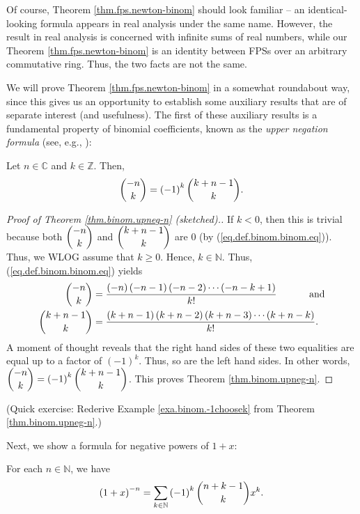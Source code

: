 Of course, Theorem \ref{thm.fps.newton-binom} should look familiar -- an
identical-looking formula appears in real analysis under the same name.
However, the result in real analysis is concerned with infinite sums of real
numbers, while our Theorem \ref{thm.fps.newton-binom} is an identity between
FPSs over an arbitrary commutative ring. Thus, the two facts are not the same.

We will prove Theorem \ref{thm.fps.newton-binom} in a somewhat roundabout way,
since this gives us an opportunity to establish some auxiliary results that
are of separate interest (and usefulness). The first of these auxiliary
results is a fundamental property of binomial coefficients, known as the
\emph{upper negation formula} (see, e.g., \cite[Proposition 1.3.7]{19fco}):

\begin{theorem}
\label{thm.binom.upneg-n}Let $n\in\mathbb{C}$ and $k\in\mathbb{Z}$. Then,%
\[
\dbinom{-n}{k}=\left(  -1\right)  ^{k}\dbinom{k+n-1}{k}.
\]

\end{theorem}

\begin{proof}
[Proof of Theorem \ref{thm.binom.upneg-n} (sketched).]If $k<0$, then this is
trivial because both $\dbinom{-n}{k}$ and $\dbinom{k+n-1}{k}$ are $0$ (by
(\ref{eq.def.binom.binom.eq})). Thus, we WLOG assume that $k\geq0$. Hence,
$k\in\mathbb{N}$. Thus, (\ref{eq.def.binom.binom.eq}) yields%
\begin{align*}
\dbinom{-n}{k}  &  =\dfrac{\left(  -n\right)  \left(  -n-1\right)  \left(
-n-2\right)  \cdots\left(  -n-k+1\right)  }{k!}\ \ \ \ \ \ \ \ \ \ \text{and}%
\\
\dbinom{k+n-1}{k}  &  =\dfrac{\left(  k+n-1\right)  \left(  k+n-2\right)
\left(  k+n-3\right)  \cdots\left(  k+n-k\right)  }{k!}.
\end{align*}
A moment of thought reveals that the right hand sides of these two equalities
are equal up to a factor of $\left(  -1\right)  ^{k}$. Thus, so are the left
hand sides. In other words, $\dbinom{-n}{k}=\left(  -1\right)  ^{k}%
\dbinom{k+n-1}{k}$. This proves Theorem \ref{thm.binom.upneg-n}.
\end{proof}

(Quick exercise: Rederive Example \ref{exa.binom.-1choosek} from Theorem
\ref{thm.binom.upneg-n}.)

Next, we show a formula for negative powers of $1+x$:

\begin{proposition}
\label{prop.fps.anti-newton-binom}For each $n\in\mathbb{N}$, we have%
\[
\left(  1+x\right)  ^{-n}=\sum_{k\in\mathbb{N}}\left(  -1\right)  ^{k}%
\dbinom{n+k-1}{k}x^{k}.
\]

\end{proposition}

